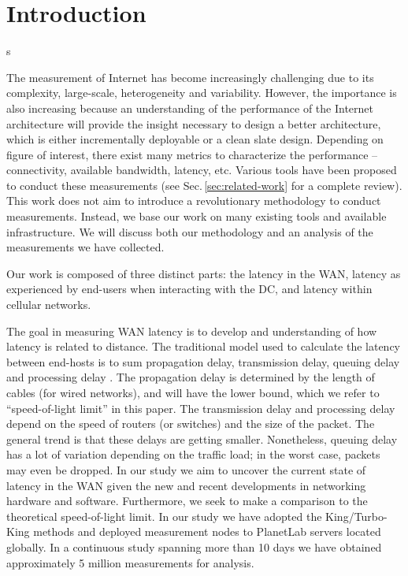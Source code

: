 \section{Introduction}
s\label{sec:introduction}

The measurement of Internet has become increasingly challenging due to its complexity, large-scale, heterogeneity and variability. However, the importance is also increasing because an understanding of the performance of the Internet architecture will provide the insight necessary to design a better architecture, which is either incrementally deployable or a clean slate design. Depending on figure of interest, there exist many metrics to characterize the performance -- connectivity, available bandwidth, latency, etc. Various tools have been proposed to conduct these measurements (see Sec.\,\ref{sec:related-work} for a complete review). This work does not aim to introduce a revolutionary methodology to conduct measurements. Instead, we base our work on many existing tools and available infrastructure. We will discuss both our methodology and an analysis of the measurements we have collected.

Our work is composed of three distinct parts: the latency in the WAN, latency as experienced by end-users when interacting with the DC, and latency within cellular networks.

The goal in measuring WAN latency is to develop and understanding of how latency is related to distance. The traditional model used to calculate the latency between end-hosts is to sum propagation delay, transmission delay, queuing delay and processing delay \cite{kurose2001computer}. The propagation delay is determined by the length of cables (for wired networks), and will have the lower bound, which we refer to ``speed-of-light limit'' in this paper. The transmission delay and processing delay depend on the speed of routers (or switches) and the size of the packet. The general trend is that these delays are getting smaller. Nonetheless, queuing delay has a lot of variation depending on the traffic load; in the worst case, packets may even be dropped. In our study we aim to uncover the current state of latency in the WAN given the new and recent developments in networking hardware and software. Furthermore, we seek to make a comparison to the theoretical speed-of-light limit. In our study we have adopted the King/Turbo-King \cite{gummadi2002king, leonard2008turbo} methods and deployed measurement nodes to PlanetLab \cite{chun2003planetlab} servers located globally. In a continuous study spanning more than 10 days we have obtained approximately 5 million measurements for analysis.

